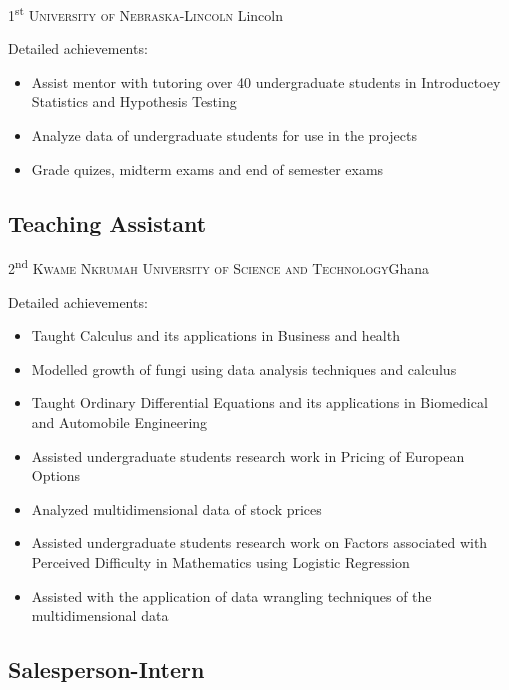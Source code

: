 \documentclass[11pt,a4paper,sans]{moderncv}\usepackage[]{graphicx}\usepackage[]{xcolor}
\begin{document}
{1\textsuperscript{st}}
{\textsc{University of Nebraska-Lincoln}}
{Lincoln}
{}{
Detailed achievements:
\begin{itemize}
\item Assist mentor with tutoring over 40 undergraduate students in Introductoey Statistics and Hypothesis Testing
\item Analyze data of undergraduate students for use in the projects
\item Grade quizes, midterm exams and end of semester exams
\end{itemize}}


\subsection{Teaching Assistant}

{2\textsuperscript{nd}}
{\textsc{Kwame Nkrumah University of Science and Technology}}{Ghana}
{}{
Detailed achievements:
\begin{itemize}
\item 	Taught Calculus and its applications in Business and health
\item 	Modelled growth of fungi using data analysis techniques and calculus
\item Taught Ordinary Differential Equations and its applications in Biomedical and Automobile Engineering
\item Assisted undergraduate students research work in Pricing of European Options
\item 	Analyzed multidimensional data of stock prices
\item 	Assisted undergraduate students research work on Factors associated with Perceived Difficulty in Mathematics using Logistic Regression
\item 	Assisted with the application of data wrangling techniques of the multidimensional data
\end{itemize}}



\subsection{Salesperson-Intern}
\end{document}
